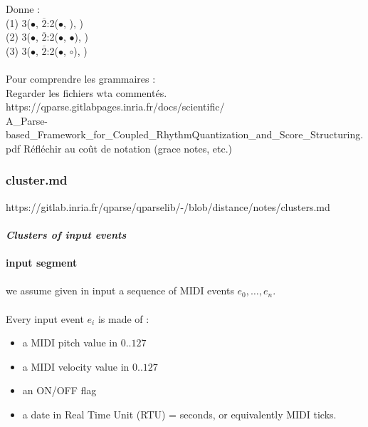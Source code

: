 Donne :\\
(1) 3($\bullet$, $\overline{2}$:2($\bullet$, ), )\\
(2) 3($\bullet$, $\overline{2}$:2($\bullet$, $\bullet$), )\\
(3) 3($\bullet$, $\overline{2}$:2($\bullet$, $\circ$), )\\\\


Pour comprendre les grammaires :\\
Regarder les fichiers wta commentés.\\
https://qparse.gitlabpages.inria.fr/docs/scientific/\\
A\_Parse-based\_Framework\_for\_Coupled\_RhythmQuantization\_and\_Score\_Structuring.pdf
Réfléchir au coût de notation (grace notes, etc.)
\newpage

\subsubsection{cluster.md}
https://gitlab.inria.fr/qparse/qparselib/-/blob/distance/notes/clusters.md\\\\
\textit{\textbf{Clusters of input events}}\\\\

\textbf{input segment}\\\\
we assume given in input a sequence of MIDI events $e_0, \ldots, e_n$.\\\\
Every input event $e_i$ is made of :
\begin{itemize}
	\item a MIDI pitch value in $0..127$
	\item a MIDI velocity value in $0..127$
	\item an ON/OFF flag
	\item a date in Real Time Unit (RTU) = seconds, or equivalently MIDI ticks.\\
\end{itemize}

